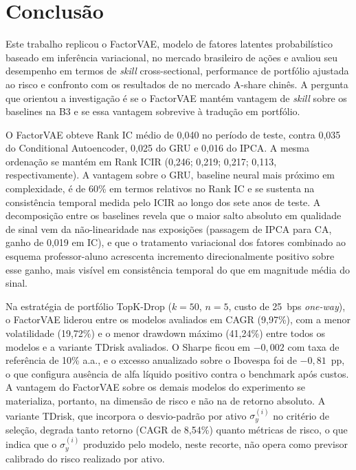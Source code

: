 \chapter{Conclusão}
\label{cap:conclusao}

Este trabalho replicou o FactorVAE, modelo de fatores latentes probabilístico baseado em inferência variacional, no mercado brasileiro de ações e avaliou seu desempenho em termos de \textit{skill} cross-sectional, performance de portfólio ajustada ao risco e confronto com os resultados de \textcite{duan2022} no mercado A-share chinês. A pergunta que orientou a investigação é se o FactorVAE mantém vantagem de \textit{skill} sobre os baselines na B3 e se essa vantagem sobrevive à tradução em portfólio.

O FactorVAE obteve Rank IC médio de 0{,}040 no período de teste, contra 0{,}035 do Conditional Autoencoder, 0{,}025 do GRU e 0{,}016 do IPCA. A mesma ordenação se mantém em Rank ICIR (0{,}246; 0{,}219; 0{,}217; 0{,}113, respectivamente). A vantagem sobre o GRU, baseline neural mais próximo em complexidade, é de 60\% em termos relativos no Rank IC e se sustenta na consistência temporal medida pelo ICIR ao longo dos sete anos de teste. A decomposição entre os baselines revela que o maior salto absoluto em qualidade de sinal vem da não-linearidade nas exposições (passagem de IPCA para CA, ganho de 0{,}019 em IC), e que o tratamento variacional dos fatores combinado ao esquema professor-aluno acrescenta incremento direcionalmente positivo sobre esse ganho, mais visível em consistência temporal do que em magnitude média do sinal.

Na estratégia de portfólio TopK-Drop ($k = 50$, $n = 5$, custo de 25~bps \textit{one-way}), o FactorVAE liderou entre os modelos avaliados em CAGR (9{,}97\%), com a menor volatilidade (19{,}72\%) e o menor drawdown máximo (41{,}24\%) entre todos os modelos e a variante TDrisk avaliados. O Sharpe ficou em $-0{,}002$ com taxa de referência de 10\% a.a., e o excesso anualizado sobre o Ibovespa foi de $-0{,}81$~pp, o que configura ausência de alfa líquido positivo contra o benchmark após custos. A vantagem do FactorVAE sobre os demais modelos do experimento se materializa, portanto, na dimensão de risco e não na de retorno absoluto. A variante TDrisk, que incorpora o desvio-padrão por ativo $\sigma_y^{(i)}$ no critério de seleção, degrada tanto retorno (CAGR de 8{,}54\%) quanto métricas de risco, o que indica que o $\sigma_y^{(i)}$ produzido pelo modelo, neste recorte, não opera como previsor calibrado do risco realizado por ativo.

